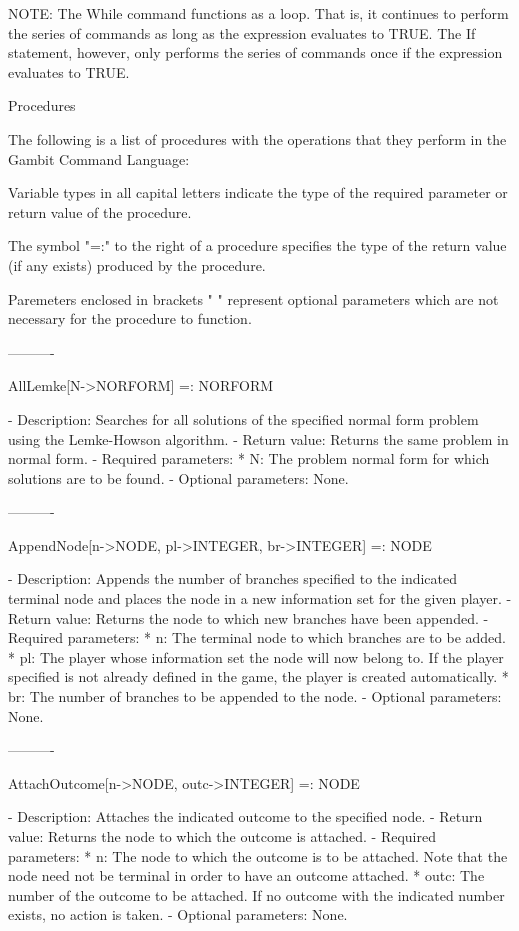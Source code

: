 	NOTE:	The While command functions as a loop.  That is, it continues
		to perform the series of commands as long as the expression
		evaluates to TRUE.  The If statement, however, only performs
		the series of commands once if the expression evaluates to
		TRUE.


Procedures

The following is a list of procedures with the operations that they perform
in the Gambit Command Language:

Variable types in all capital letters indicate the type of the required
parameter or return value of the procedure.

The symbol "=:" to the right of a procedure specifies the type of the return
value (if any exists) produced by the procedure.

Paremeters enclosed in brackets "{ }" represent optional parameters which
are not necessary for the procedure to function.

----------

AllLemke[N->NORFORM] =: NORFORM

   -	Description:  Searches for all solutions of the specified normal form
	problem using the Lemke-Howson algorithm.
   -	Return value:  Returns the same problem in 
	normal form.
   -	Required parameters:
	  *  N:  The problem normal form for which solutions are to be found.
   -	Optional parameters:  None.

----------

AppendNode[n->NODE, pl->INTEGER, br->INTEGER] =: NODE

   -	Description:  Appends the number of branches specified to the indicated
	terminal node and places the node in a new information set for the
	given player.
   -	Return value:  Returns the node to which new branches have been 
	appended.
   -	Required parameters:
	  *  n:  The terminal node to which branches are to be added.
	  *  pl:  The player whose information set the node will now belong to.
	     If the player specified is not already defined in the game, the 
	     player is created automatically. 
	  *  br:  The number of branches to be appended to the node.
   -	Optional parameters:  None.

----------

AttachOutcome[n->NODE, outc->INTEGER] =: NODE

   -	Description:  Attaches the indicated outcome to the specified node.  
   -	Return value:  Returns the node to which the outcome is attached.
   -	Required parameters:
	  *  n:  The node to which the outcome is to be attached.  Note that
	     the node need not be terminal in order to have an outcome 
	     attached.
	  *  outc:  The number of the outcome to be attached.  If no outcome 
	     with the indicated number exists, no action is taken.  
   -	Optional parameters:  None.

